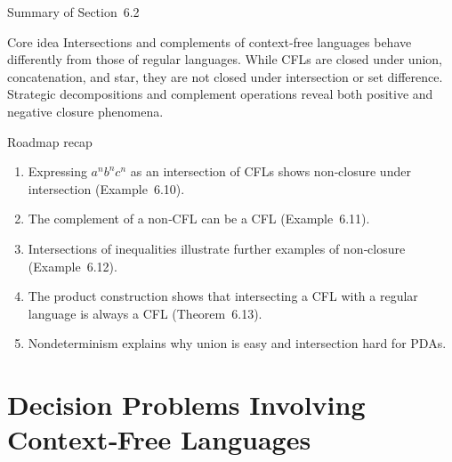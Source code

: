\begin{frame}[t]{Summary of Section 6.2}
  \begin{tblock}{Core idea}
    Intersections and complements of context‑free languages behave
    differently from those of regular languages.  While CFLs are closed
    under union, concatenation, and star, they are not closed under
    intersection or set difference.  Strategic decompositions and
    complement operations reveal both positive and negative closure
    phenomena.
  \end{tblock}
  \begin{tblock}{Roadmap recap}
    \begin{enumerate}
      \item Expressing $a^n b^n c^n$ as an intersection of CFLs shows
        non‑closure under intersection (Example 6.10).
      \item The complement of a non‑CFL can be a CFL (Example 6.11).
      \item Intersections of inequalities illustrate further examples of
        non‑closure (Example 6.12).
      \item The product construction shows that intersecting a CFL with
        a regular language is always a CFL (Theorem 6.13).
      \item Nondeterminism explains why union is easy and intersection
        hard for PDAs.
    \end{enumerate}
  \end{tblock}
  \label{fr:6.2-25}
\end{frame}

%

\section{Decision Problems Involving Context‑Free Languages}

